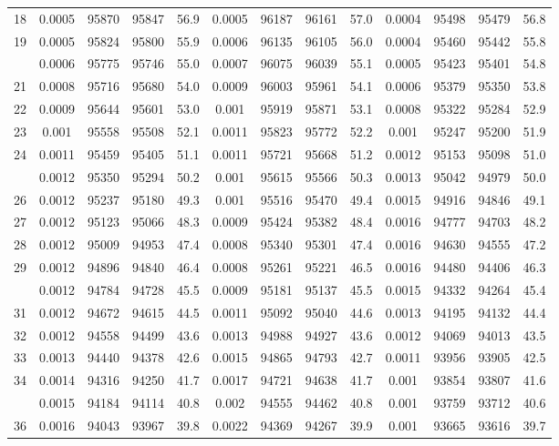 \documentclass[
  14pt,
]{article}
\begin{document}
\begin{longtable}[t]{lcccccccccccc}
18 & 0.0005 & 95870 & 95847 & 56.9 & 0.0005 & 96187 & 96161 & 57.0 & 0.0004 & 95498 & 95479 & 56.8\\
19 & 0.0005 & 95824 & 95800 & 55.9 & 0.0006 & 96135 & 96105 & 56.0 & 0.0004 & 95460 & 95442 & 55.8\\
\addlinespace
20 & 0.0006 & 95775 & 95746 & 55.0 & 0.0007 & 96075 & 96039 & 55.1 & 0.0005 & 95423 & 95401 & 54.8\\
21 & 0.0008 & 95716 & 95680 & 54.0 & 0.0009 & 96003 & 95961 & 54.1 & 0.0006 & 95379 & 95350 & 53.8\\
22 & 0.0009 & 95644 & 95601 & 53.0 & 0.001 & 95919 & 95871 & 53.1 & 0.0008 & 95322 & 95284 & 52.9\\
23 & 0.001 & 95558 & 95508 & 52.1 & 0.0011 & 95823 & 95772 & 52.2 & 0.001 & 95247 & 95200 & 51.9\\
24 & 0.0011 & 95459 & 95405 & 51.1 & 0.0011 & 95721 & 95668 & 51.2 & 0.0012 & 95153 & 95098 & 51.0\\
\addlinespace
25 & 0.0012 & 95350 & 95294 & 50.2 & 0.001 & 95615 & 95566 & 50.3 & 0.0013 & 95042 & 94979 & 50.0\\
26 & 0.0012 & 95237 & 95180 & 49.3 & 0.001 & 95516 & 95470 & 49.4 & 0.0015 & 94916 & 94846 & 49.1\\
27 & 0.0012 & 95123 & 95066 & 48.3 & 0.0009 & 95424 & 95382 & 48.4 & 0.0016 & 94777 & 94703 & 48.2\\
28 & 0.0012 & 95009 & 94953 & 47.4 & 0.0008 & 95340 & 95301 & 47.4 & 0.0016 & 94630 & 94555 & 47.2\\
29 & 0.0012 & 94896 & 94840 & 46.4 & 0.0008 & 95261 & 95221 & 46.5 & 0.0016 & 94480 & 94406 & 46.3\\
\addlinespace
30 & 0.0012 & 94784 & 94728 & 45.5 & 0.0009 & 95181 & 95137 & 45.5 & 0.0015 & 94332 & 94264 & 45.4\\
31 & 0.0012 & 94672 & 94615 & 44.5 & 0.0011 & 95092 & 95040 & 44.6 & 0.0013 & 94195 & 94132 & 44.4\\
32 & 0.0012 & 94558 & 94499 & 43.6 & 0.0013 & 94988 & 94927 & 43.6 & 0.0012 & 94069 & 94013 & 43.5\\
33 & 0.0013 & 94440 & 94378 & 42.6 & 0.0015 & 94865 & 94793 & 42.7 & 0.0011 & 93956 & 93905 & 42.5\\
34 & 0.0014 & 94316 & 94250 & 41.7 & 0.0017 & 94721 & 94638 & 41.7 & 0.001 & 93854 & 93807 & 41.6\\
\addlinespace
35 & 0.0015 & 94184 & 94114 & 40.8 & 0.002 & 94555 & 94462 & 40.8 & 0.001 & 93759 & 93712 & 40.6\\
36 & 0.0016 & 94043 & 93967 & 39.8 & 0.0022 & 94369 & 94267 & 39.9 & 0.001 & 93665 & 93616 & 39.7\\

\end{longtable}
\end{document}
